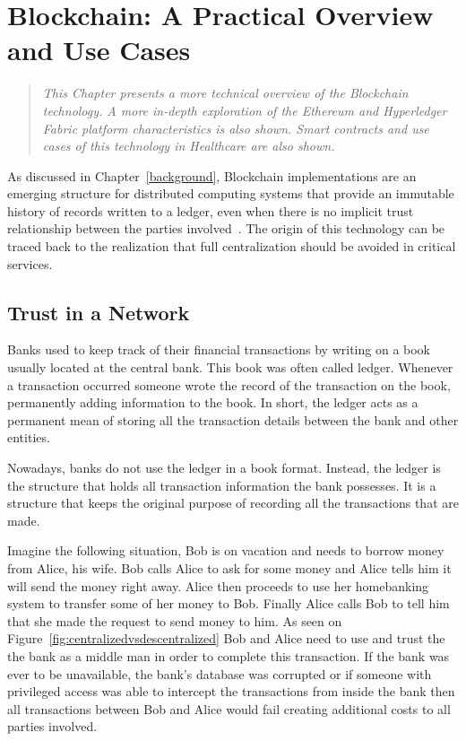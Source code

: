 \chapter{Blockchain: A Practical Overview and Use Cases}\label{blockchain}

\begin{quote} 
  \emph{This Chapter presents a more technical overview of the Blockchain
  technology. A more in-depth exploration of the Ethereum and Hyperledger
  Fabric platform characteristics is also shown. Smart contracts and use cases
  of this technology in Healthcare are also shown.}
\end{quote}

As discussed in Chapter~\ref{background}, Blockchain implementations are an
emerging structure for distributed computing systems that provide an immutable
history of records written to a ledger, even when there is no implicit trust
relationship between the parties involved~\cite{Barclay2017}. The origin of
this technology can be traced back to the realization that full centralization
should be avoided in critical services.

\section{Trust in a Network}

Banks used to keep track of their financial transactions by writing on a book
usually located at the central bank. This book was often called ledger.
Whenever a transaction occurred someone wrote the record of the transaction on
the book, permanently adding information to the book. In short, the ledger acts
as a permanent mean of storing all the transaction details between the bank and
other entities. 

Nowadays, banks do not use the ledger in a book format. Instead, the ledger is
the structure that holds all transaction information the bank possesses. It is
a structure that keeps the original purpose of recording all the transactions
that are made.

Imagine the following situation, Bob is on vacation and needs to borrow money
from Alice, his wife. Bob calls Alice to ask for some money and Alice tells him
it will send the money right away. Alice then proceeds to use her homebanking
system to transfer some of her money to Bob. Finally Alice calls Bob to tell
him that she made the request to send money to him.  As seen on
Figure~\ref{fig:centralizedvsdescentralized} Bob and Alice need to use and
trust the the bank as a middle man in order to complete this transaction. If
the bank was ever to be unavailable, the bank's database was corrupted or if
someone with  privileged access was able to intercept the transactions from
inside the bank then all transactions between Bob and Alice would fail creating
additional costs to all parties involved. 

